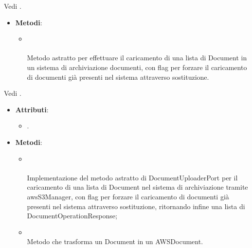\documentclass[10pt, a4paper]{article}
\begin{document}
Vedi .

\label{DocumentUploaderPortDettaglio}
\begin{itemize}
    \item \textbf{Metodi}:
    \begin{itemize}
        \item {}\\ \\
        Metodo astratto per effettuare il caricamento di una lista di Document in un sistema di archiviazione documenti, con flag per forzare il caricamento di documenti già presenti nel sistema attraverso sostituzione.
    \end{itemize}
\end{itemize}

Vedi .

\label{DocumentUploaderAWSS3Dettaglio}
\begin{itemize}
    \item \textbf{Attributi}:
    \begin{itemize}
        \item {}.
    \end{itemize}
    \item \textbf{Metodi}:
    \begin{itemize}
        \item {}\\ \\
        Implementazione del metodo astratto di DocumentUploaderPort per il caricamento di una lista di Document nel sistema di archiviazione tramite awsS3Manager, con flag per  forzare il caricamento di documenti già presenti nel sistema attraverso sostituzione, ritornando infine una lista di DocumentOperationResponse;
        \item {}\\
        Metodo che trasforma un Document in un AWSDocument.
    \end{itemize}
\end{itemize}
\end{document}
